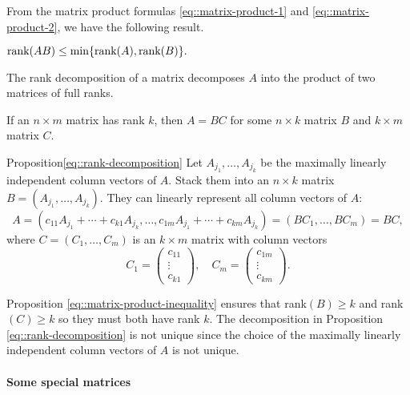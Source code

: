 From the matrix product formulas \eqref{eq::matrix-product-1} and \eqref{eq::matrix-product-2}, we have the following result.

\begin{proposition}\label{eq::matrix-product-inequality}
$
\textup{rank}(AB) \leq  \min\{  \textup{rank}(A),  \textup{rank}(B) \} . 
$
\end{proposition}


The rank decomposition of a matrix decomposes $A$ into the product of two matrices of full ranks. 

\begin{proposition}\label{eq::rank-decomposition}
If an $n\times m$ matrix has rank $k$, then $A = BC$ for some $n\times k$ matrix $B$ and $k\times m$ matrix $C$. 
\end{proposition}

\begin{myproof}{Proposition}{\ref{eq::rank-decomposition}}
Let $A_{j_1}, \ldots, A_{j_k}$ be the maximally linearly independent column vectors of $A$. Stack them into an $n\times k$ matrix $B = (A_{j_1}, \ldots, A_{j_k}) $. They can linearly represent all column vectors of $A$:
$$
A = (c_{11} A_{j_1} + \cdots + c_{k1} A_{j_k}, \ldots, c_{1m} A_{j_1} + \cdots + c_{km} A_{j_k} )
=  (BC_1, \ldots, B C_m) = BC,
$$
where $C =  ( C_1, \ldots,  C_m)$ is an $k\times m$ matrix with column vectors
$$
C_1 = \begin{pmatrix}
c_{11}  \\
\vdots\\
 c_{k1}
\end{pmatrix},\quad
C_m = \begin{pmatrix}
 c_{1m} \\
 \vdots \\
 c_{km}
\end{pmatrix}.
$$
\end{myproof}


Proposition \ref{eq::matrix-product-inequality} ensures that rank$(B) \geq k$ and rank$(C) \geq k$ so they must both have rank $k$. The decomposition in Proposition \ref{eq::rank-decomposition} is not unique since the choice of the maximally linearly independent column vectors of $A$ is not unique. 


\paragraph*{Some special matrices}


